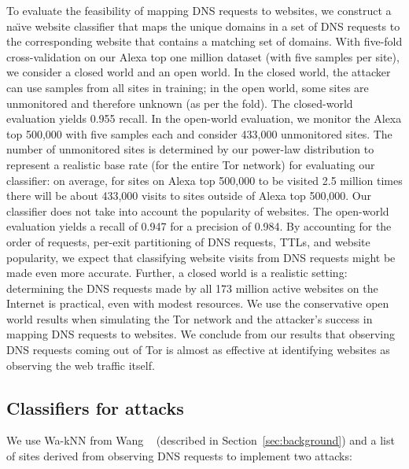 To evaluate the feasibility of mapping DNS requests to websites, we
construct a na\"{\i}ve website classifier that maps the unique domains
in a set of DNS requests to the corresponding website that contains a
matching set of domains.  With five-fold cross-validation on our Alexa
top one million dataset (with five samples per site),
we consider a closed world and an open world.
In the closed world, the attacker can use samples
from all sites in training; in the open world, some sites
are unmonitored and therefore unknown (as per the fold).  The
closed-world evaluation yields 0.955 recall.  In the open-world
evaluation, we monitor the Alexa top 500,000 with five samples each and
consider 433,000 unmonitored sites.  The number of unmonitored sites is
determined by our power-law
distribution to represent a realistic base rate (for the entire Tor network)
for evaluating our classifier: on average, for sites on Alexa top 500,000
to be visited 2.5 million times there will be about 433,000 visits to sites
outside of Alexa top 500,000.  Our classifier does not take into account the
popularity of websites.
The open-world evaluation yields a
recall of 0.947 for a precision of 0.984.  By accounting for the order
of requests, per-exit partitioning of DNS requests, TTLs, and website
popularity, we expect that classifying website visits from DNS requests
might be made even more accurate.
Further, a closed world is a realistic setting:
determining the DNS requests made by all 173 million active websites on the
Internet is practical, even with modest resources.
We use the conservative open world results when simulating the Tor network and
the attacker's success in mapping DNS requests to websites.
We conclude from our results that observing DNS requests coming out of Tor is
almost as effective at identifying websites as observing the web traffic
itself.

\subsection{Classifiers for \name attacks}

We use Wa-kNN from Wang \ea~\cite{Wang2014a} (described in
Section~\ref{sec:background}) and a list of sites derived from
observing DNS requests to implement two \name attacks:

